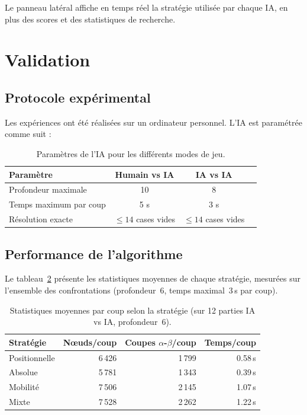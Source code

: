 \documentclass[12pt, a4paper]{article}
\begin{document}
Le panneau latéral affiche en temps réel la stratégie utilisée par chaque IA, en plus des scores et des statistiques de recherche.


\section{Validation}
\label{sec:validation}

\subsection{Protocole expérimental}

Les expériences ont été réalisées sur un ordinateur personnel. L'IA est paramétrée comme suit :

\begin{table}[H]
\centering
\caption{Paramètres de l'IA pour les différents modes de jeu.}
\label{tab:parametres}
\begin{tabular}{@{} l c c c @{}}
\toprule
\textbf{Paramètre} & \textbf{Humain vs IA} & \textbf{IA vs IA} \\
\midrule
Profondeur maximale & 10 & 8 \\
Temps maximum par coup & 5 s & 3 s \\
Résolution exacte & $\leq 14$ cases vides & $\leq 14$ cases vides \\
\bottomrule
\end{tabular}
\end{table}


\subsection{Performance de l'algorithme}

Le tableau~\ref{tab:performance} présente les statistiques moyennes de chaque stratégie, mesurées sur l'ensemble des confrontations (profondeur~6, temps maximal~3\,s par coup).

\begin{table}[H]
\centering
\caption{Statistiques moyennes par coup selon la stratégie (sur 12 parties IA vs IA, profondeur~6).}
\label{tab:performance}
\begin{tabular}{@{} l r r r @{}}
\toprule
\textbf{Stratégie} & \textbf{Nœuds/coup} & \textbf{Coupes $\alpha$-$\beta$/coup} & \textbf{Temps/coup} \\
\midrule
Positionnelle & 6\,426  & 1\,799 & 0.58\,s \\
Absolue       & 5\,781  & 1\,343 & 0.39\,s \\
Mobilité      & 7\,506  & 2\,145 & 1.07\,s \\
Mixte         & 7\,528  & 2\,262 & 1.22\,s \\
\bottomrule
\end{tabular}
\end{table}
\end{document}
